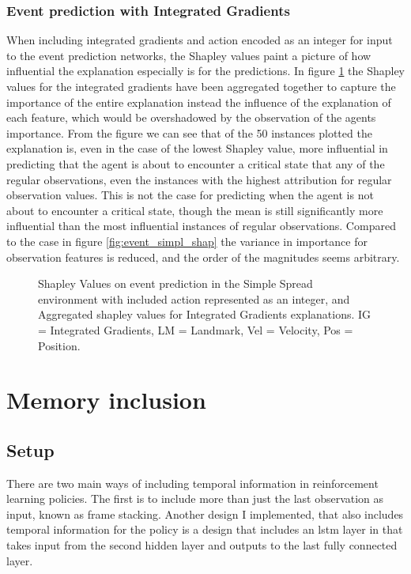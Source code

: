\documentclass[UKenglish]{uiomasterthesis}
\begin{document}
\subsubsection{Event prediction with Integrated Gradients}
When including integrated gradients and action encoded as an integer for input to the event prediction networks, the Shapley values paint a picture of how influential
the explanation especially is for the predictions. In figure \ref{fig:event_simpl_ig_shap} the Shapley values for the integrated gradients have been aggregated together to capture the importance of the entire explanation instead the influence of the explanation of each feature, which would be overshadowed by the observation of the agents importance. From the figure we can see that of the 50 instances plotted the explanation is, even in the case of the lowest Shapley value, more influential in predicting that the agent is about to encounter a critical state that any of the regular observations, even the instances with the highest attribution for regular observation values. This is not the case for predicting when the agent is not about to encounter a critical state, though the mean is still significantly more influential than the most influential instances of regular observations. Compared to the case in figure \ref{fig:event_simpl_shap} the variance in importance for observation features is reduced, and the order of the magnitudes seems arbitrary.

\begin{center}
\begin{figure}[h]
\label{fig:event_simpl_ig_shap}

\caption{Shapley Values on event prediction in the Simple Spread environment with included action represented as an integer, and Aggregated shapley values for Integrated Gradients explanations. IG = Integrated Gradients, LM = Landmark, Vel = Velocity, Pos = Position.}
\end{figure}
\end{center}

\section{Memory inclusion}
\label{sec:exp_2}

\subsection{Setup}

There are two main ways of including temporal information in reinforcement learning policies. The first is to include more than just the last observation as input, known as frame stacking. Another design I implemented, that also includes temporal information for the policy is a design that includes an \ac{lstm} layer in that takes input from the second hidden layer and outputs to the last fully connected layer.
\end{document}
